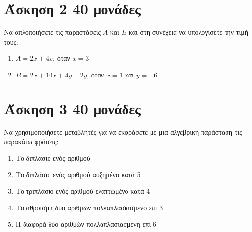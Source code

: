 \documentclass[a4paper,10pt]{report}
\begin{document}
\section*{Άσκηση 2  \hfill \small{40 μονάδες}}
Να απλοποιήσετε τις παραστάσεις $Α$ και $Β$ και στη συνέχεια να υπολογίσετε την τιμή τους.
\begin{enumerate}[1)]
 \item $Α=2x+4x$, όταν $x=3$
 \item $Β=2x+10x+4y-2y$, όταν $x=1$ και $y=-6$
\end{enumerate}




\section*{Άσκηση 3  \hfill \small{40 μονάδες}}
Να χρησιμοποιήσετε μεταβλητές για να εκφράσετε με μια αλγεβρική παράσταση τις παρακάτω φράσεις:
\begin{enumerate}[1)]
 \item Το διπλάσιο ενός αριθμού
 \item Το διπλάσιο ενός αριθμού αυξημένο κατά 5 
 \item Το τριπλάσιο ενός αριθμού ελαττωμένο κατά 4
 \item Το άθροισμα δύο αριθμών πολλαπλασιασμένο επί 3
 \item Η διαφορά δύο αριθμών πολλαπλασιασμένη επί 6
\end{enumerate}
\end{document}
